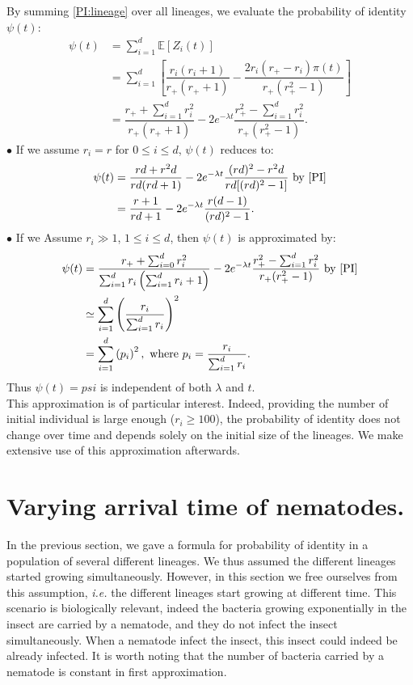 \documentclass{article}
\begin{document}
By summing \eqref{PI:lineage} over all lineages, we evaluate the probability of identity $\psi(t)$:
\begin{align}
\psi(t) &= \displaystyle \sum_{i=1}^d \mathbb{E}\left[ Z_i(t) \right]\\
&= \displaystyle \sum_{i=1}^d \left[ \dfrac{r_i(r_i+1)}{r_+ (r_+ +1 )}-\dfrac{2 r_i (r_+ -r_{i})\pi(t)}{r_+ (r_+^2 -1 )} \right] \\
&=    \dfrac{ r_+ + \sum_{i=1}^d r_i^2}{r_+ (r_+ +1)}  -2 e^{-\lambda t} \dfrac{ r_+^2-\sum_{i=1}^d r_i^2}{r_+ (r_+^2 -1) }. \label{PI}
\end{align}
$\bullet$ If we assume $r_i=r$ for $0 \leq i \leq d$, $\psi(t)$ reduces to:
\begin{align}
\psi(t) &= \dfrac{ rd + r^2 d}{rd (rd +1)}  -2 e^{-\lambda t} \dfrac{ (rd)^2-r^2d}{rd [(rd)^2 -1] }  \text{ by } \eqref{PI} \\ 
 &= \dfrac{r+1}{rd+1}  -2e^{-\lambda t} \dfrac{r(d-1)}{(rd)^2 -1 }.
\end{align}
$\bullet$ If we Assume $r_i \gg 1$, $ 1 \leq i \leq d $, then $\psi(t)$ is approximated by:
 \begin{align}
\psi(t) &= \dfrac{ r_+ + \sum_{i=0}^d r_i^2}{\sum_{i=1}^d r_i \left(\sum_{i=1}^d r_i +1\right) }  -2 e^{-\lambda t} \dfrac{ r_+^2-\sum_{i=1}^d r_i^2}{r_+ (r_+^2 -1) } \text{ by } \eqref{PI} \\
 & \simeq \displaystyle \sum_{i=1}^d \left( \dfrac{ r_i}{\sum_{i=1}^d r_i} \right)^2 \\
 &= \displaystyle \sum_{i=1}^d \left( p_i \right)^2,\text{ where } p_i=\dfrac{ r_i}{\sum_{i=1}^d r_i}. \label{simplify:relatedness}
 \end{align}
 Thus $\psi(t)=psi$ is independent of both $\lambda$ and $t$. \\
 This approximation is of particular interest. Indeed, providing the number of initial individual is large enough ($r_i \geq 100$), the probability of identity does not change over time and depends solely on the initial size of the lineages. We make extensive use of this approximation afterwards.

 
\section{Varying arrival time of nematodes.}
\label{section_nematode}
In the previous section, we gave a formula for probability of identity in a population of several different lineages. We thus assumed the different lineages started growing simultaneously.
However, in this section we free ourselves from this assumption, \textit{i.e.} the different lineages start growing at different time. This scenario is biologically relevant, indeed the bacteria growing exponentially in the insect are carried by a nematode, and they do not infect the insect simultaneously. When a nematode infect the insect, this insect could indeed be already infected. It is worth noting that the number of bacteria carried by a nematode is constant in first approximation. 
 
\end{document}
